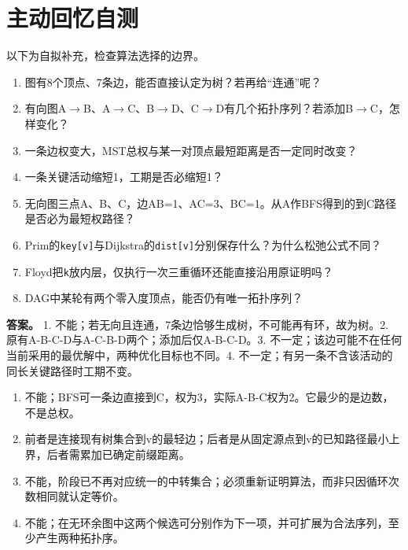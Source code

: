 \section{主动回忆自测}\label{DS06-check}

以下为自拟补充，检查算法选择的边界。

\begin{enumerate}
\def\labelenumi{\arabic{enumi}.}
\item
  图有8个顶点、7条边，能否直接认定为树？若再给``连通''呢？
\item
  有向图A\ensuremath{\to}B、A\ensuremath{\to}C、B\ensuremath{\to}D、C\ensuremath{\to}D有几个拓扑序列？若添加B\ensuremath{\to}C，怎样变化？
\item
  一条边权变大，MST总权与某一对顶点最短距离是否一定同时改变？
\item
  一条关键活动缩短1，工期是否必缩短1？
\item
  无向图三点A、B、C，边AB=1、AC=3、BC=1。从A作BFS得到的到C路径是否必为最短权路径？
\item
  Prim的\texttt{key[\allowbreak{}v]\allowbreak{}}与Dijkstra的\texttt{dist[\allowbreak{}v]\allowbreak{}}分别保存什么？为什么松弛公式不同？
\item
  Floyd把\texttt{k}放内层，仅执行一次三重循环还能直接沿用原证明吗？
\item
  DAG中某轮有两个零入度顶点，能否仍有唯一拓扑序列？
\end{enumerate}

\textbf{答案。} 1. 不能；若无向且连通，7条边恰够生成树，不可能再有环，故为树。2. 原有A-B-C-D与A-C-B-D两个；添加后仅A-B-C-D。3. 不一定；该边可能不在任何当前采用的最优解中，两种优化目标也不同。4. 不一定；有另一条不含该活动的同长关键路径时工期不变。

\begin{enumerate}
\def\labelenumi{\arabic{enumi}.}
\setcounter{enumi}{4}
\tightlist
\item
  不能；BFS可一条边直接到C，权为3，实际A-B-C权为2。它最少的是边数，不是总权。
\item
  前者是连接现有树集合到v的最轻边；后者是从固定源点到v的已知路径最小上界，后者需累加已确定前缀距离。
\item
  不能，阶段已不再对应统一的中转集合；必须重新证明算法，而非只因循环次数相同就认定等价。
\item
  不能；在无环余图中这两个候选可分别作为下一项，并可扩展为合法序列，至少产生两种拓扑序。
\end{enumerate}
